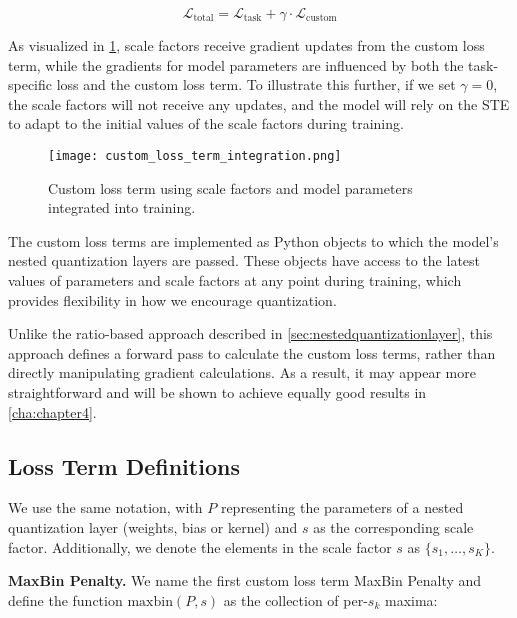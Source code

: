 \[
\mathcal{L}_{\text{total}} = \mathcal{L}_{\text{task}} + \gamma \cdot \mathcal{L}_{\text{custom}}
\]

As visualized in \cref{fig:custom_loss_term_integration}, 
scale factors receive gradient updates from the custom loss term,
while the gradients for model parameters are influenced by both the task-specific loss
and the custom loss term. To illustrate this further,
if we set \( \gamma = 0 \), the scale factors will not receive any updates,
and the model will rely on the STE to adapt to the initial values of the scale factors during training.

\begin{figure}[t!]
  \centering
  \texttt{[image: custom\_loss\_term\_integration.png]}
  \caption{Custom loss term using scale factors and model parameters integrated into training.}
  \label{fig:custom_loss_term_integration}
\end{figure}

The custom loss terms are implemented as Python objects
to which the model's nested quantization layers are passed.
These objects have access to the latest values of parameters
and scale factors at any point during training,
which provides flexibility in how we encourage quantization.

Unlike the ratio-based approach described in \cref{sec:nestedquantizationlayer},
this approach defines a forward pass to calculate the custom loss terms,
rather than directly manipulating gradient calculations.
As a result, it may appear more straightforward
and will be shown to achieve equally good results in \cref{cha:chapter4}.

\subsection{Loss Term Definitions}
\label{subsec:losstermdefinitions}

\hspace*{1em} We use the same notation, 
with \( P \) representing the parameters of a nested quantization
layer (weights, bias or kernel) and \( s \) as the corresponding scale factor.
Additionally, we denote the elements in the scale factor \( s \) as \( \{ s_1, \dots, s_K \} \).

\textbf{MaxBin Penalty.} We name the first custom loss term MaxBin Penalty and
define the function \( \text{maxbin}(P, s) \) 
as the collection of per-\( s_k\) maxima:

